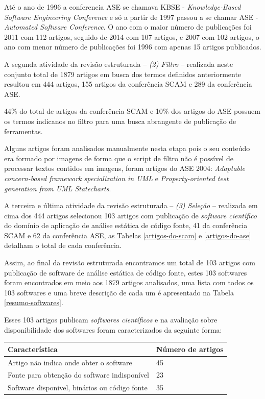 Até o ano de 1996 a conferencia ASE se chamava KBSE - {\it Knowledge-Based
Software Engineering Conference} e só a partir de 1997 passou a se chamar ASE -
{\it Automated Software Conference}. O ano com o maior número de publicações
foi 2011 com 112 artigos, seguido de 2014 com 107 artigos, e 2007 com 102
artigos, o ano com menor número de publicações foi 1996 com apenas 15 artigos
publicados.

A segunda atividade da revisão estruturada -- {\it (2) Filtro} -- realizada
neste conjunto total de 1879 artigos em busca dos termos definidos
anteriormente resultou em 444 artigos, 155 artigos da conferência SCAM e 289 da
conferência ASE.

44\% do total de artigos da conferência SCAM e 10\% dos artigos do ASE possuem
os termos indicanos no filtro para uma busca abrangente de publicação de
ferramentas.

Alguns artigos foram analisados manualmente nesta etapa pois o seu conteúdo era
formado por imagens de forma que o script de filtro não é possível de processar
textos contidos em imagens, foram artigos do ASE 2004: {\it Adaptable
concern-based framework specialization in UML} e {\it Property-oriented test
generation from UML Statecharts}.

A terceira e última atividade da revisão estruturada -- {\it (3) Seleção} --
realizada em cima dos 444 artigos selecionou 103 artigos com publicação de {\it %
software científico} do domínio de aplicação de análise estática de código
fonte, 41 da conferência SCAM e 62 da conferência ASE, as Tabelas
\ref{artigos-do-scam} e \ref{artigos-do-ase} detalham o total de cada
conferência.

Assim, ao final da revisão estruturada encontramos um total de 103 artigos com
publicação de software de análise estática de código fonte, estes 103 softwares
foram encontrados em meio aos 1879 artigos analisados,
uma lista com todos os 103 softwares e uma breve descrição de cada um é
apresentado na Tabela \ref{resumo-softwares}.

Esses 103 artigos publicam {\it softwares científicos} e na avaliação sobre
disponibilidade dos softwares foram caracterizados da seguinte forma:

\begin{table}[H]
\centering
\begin{tabular}{| l | l |}
  \hline
  {\bf Característica}                          & {\bf Número de artigos} \\
  \hline
  Artigo não indica onde obter o software       & 45 \\
  \hline
  Fonte para obtenção do software indisponível  & 23 \\
  \hline
  Software disponivel, binários ou código fonte & 35 \\
  \hline
\end{tabular}
\end{table}

